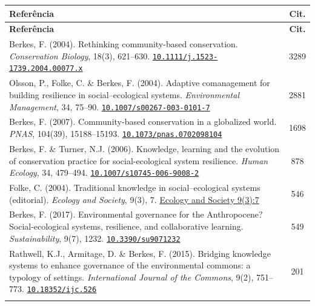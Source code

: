 \documentclass[a4paper,11pt]{article}
\newcommand{\doi}[1]{\href{https://doi.org/#1}{\texttt{#1}}}
\begin{document}
\begin{longtable}{>{\raggedright\arraybackslash}p{} c}
\toprule
\textbf{Referência} & \textbf{Cit.} \\
\midrule
\endfirsthead
\toprule
\textbf{Referência} & \textbf{Cit.} \\
\midrule
\endhead

Berkes, F. (2004). Rethinking community-based conservation. \textit{Conservation Biology}, 18(3), 621--630.\newline
\doi{10.1111/j.1523-1739.2004.00077.x} & 3289 \\
\addlinespace

Olsson, P., Folke, C. \& Berkes, F. (2004). Adaptive comanagement for building resilience in social--ecological systems. \textit{Environmental Management}, 34, 75--90.\newline
\doi{10.1007/s00267-003-0101-7} & 2881 \\
\addlinespace

Berkes, F. (2007). Community-based conservation in a globalized world. \textit{PNAS}, 104(39), 15188--15193.\newline
\doi{10.1073/pnas.0702098104} & 1698 \\
\addlinespace

Berkes, F. \& Turner, N.J. (2006). Knowledge, learning and the evolution of conservation practice for social-ecological system resilience. \textit{Human Ecology}, 34, 479--494.\newline
\doi{10.1007/s10745-006-9008-2} & 878 \\
\addlinespace

Folke, C. (2004). Traditional knowledge in social--ecological systems (editorial). \textit{Ecology and Society}, 9(3), 7.\newline
\href{https://www.ecologyandsociety.org/vol9/iss3/art7/}{Ecology and Society 9(3):7} & 546 \\
\addlinespace

Berkes, F. (2017). Environmental governance for the Anthropocene? Social-ecological systems, resilience, and collaborative learning. \textit{Sustainability}, 9(7), 1232.\newline
\doi{10.3390/su9071232} & 549 \\
\addlinespace

Rathwell, K.J., Armitage, D. \& Berkes, F. (2015). Bridging knowledge systems to enhance governance of the environmental commons: a typology of settings. \textit{International Journal of the Commons}, 9(2), 751--773.\newline
\doi{10.18352/ijc.526} & 201 \\
\addlinespace


\end{longtable}
\end{document}

